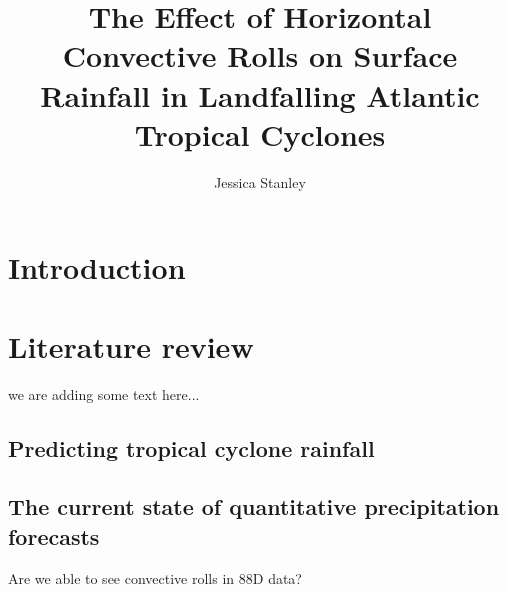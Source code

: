 \documentclass[12pt]{article}
\author{Jessica Stanley} \title{The Effect of Horizontal Convective Rolls on Surface Rainfall in Landfalling Atlantic Tropical Cyclones}
\begin{document}
\maketitle


\section{Introduction}

\section{Literature review}

we are adding some text here...

\subsection{Predicting tropical cyclone rainfall} 

\subsection{The current state of quantitative precipitation forecasts}

Are we able to see convective rolls in 88D data?
\end{document}
